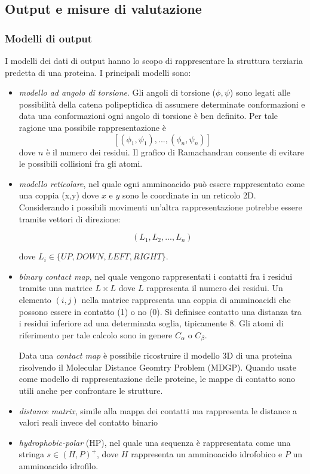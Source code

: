 \subsection{Output e misure di valutazione}

\subsubsection{Modelli di output}
I modelli dei dati di output hanno lo scopo di rappresentare la struttura terziaria predetta di una proteina. I principali modelli sono\supercite{marquez2015soft}:

\begin{itemize}
	\item \textit{modello ad angolo di torsione}. Gli angoli di torsione ($\phi, \psi$) sono legati alle possibilità della catena polipeptidica di assumere determinate conformazioni e data una conformazioni ogni angolo di torsione è ben definito. Per tale ragione una possibile rappresentazione è
	\[ [(\phi_{1}, \psi_{1}), ..., (\phi_{n}, \psi_{n})] \]
	dove $n$ è il numero dei residui. Il grafico di Ramachandran consente di evitare le possibili collisioni fra gli atomi. \\
	
	\item \textit{modello reticolare}, nel quale ogni amminoacido può essere rappresentato come una coppia (x,y) dove $x$ e $y$ sono le coordinate in un reticolo 2D. Considerando i possibili movimenti un'altra rappresentazione potrebbe essere tramite vettori di direzione:
	
	\[ (L_{1}, L_{2}, ..., L_{n}) \]
	
	dove $L_{i} \in \{UP,DOWN,LEFT,RIGHT\}$.\\
	
	\item \textit{binary contact map}, nel quale vengono rappresentati i contatti fra i residui tramite una matrice $L\times L$ dove $L$ rappresenta il numero dei residui. Un elemento $(i,j)$ nella matrice rappresenta una coppia di amminoacidi che possono essere in contatto (1) o no (0). Si definisce contatto una distanza tra i residui inferiore ad una determinata soglia, tipicamente 8\angstrom. Gli atomi di riferimento per tale calcolo sono in genere $C_{\alpha}$ o $C_{\beta}$.
	
	\par Data una \textit{contact map} è possibile ricostruire il modello 3D di una proteina risolvendo il Molecular Distance Geomtry Problem (MDGP). Quando usate come modello di rappresentazione delle proteine, le mappe di contatto sono	utili anche per confrontare le strutture. \\
	
	\item \textit{distance matrix}, simile alla mappa dei contatti ma rappresenta le distance a valori reali invece del contatto binario\\
	\item \textit{hydrophobic-polar} (HP), nel quale una sequenza è rappresentata come una stringa $s\in (H,P)^{+}$, dove $H$ rappresenta un amminoacido idrofobico e $P$ un amminoacido idrofilo.
	
\end{itemize}
